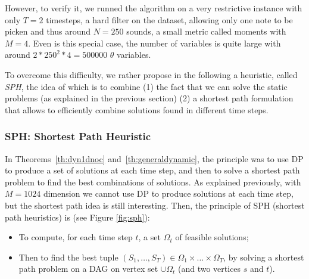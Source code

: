 \documentclass[a4paper]{book}
\begin{document}
However, to verify it, we runned the algorithm on a very restrictive instance with only $T=2$ timesteps, a hard filter on the dataset, allowing only one note to be picken and thus around $N=250$ sounds, a small metric called moments with $M=4$. Even is this special case, the number of variables is quite large with around $2*250^2*4=500000$ $\theta$ variables. 




To overcome this difficulty, we rather propose in the following a heuristic, called {\it SPH}, the idea of which is to combine (1) the fact that we can solve the static problems (as explained in the previous section) (2) a shortest path formulation that allows to efficiently combine  solutions found in different time steps.  


\subsubsection{SPH: Shortest Path Heuristic}





In Theorems~\ref{th:dyn1dnoc} and~\ref{th:generaldynamic}, the principle was to use DP to produce a set of solutions at each time step, and then to solve a shortest path problem to find the best combinations of solutions. As explained previously, with $M=1024$ dimension we cannot use DP to produce solutions at each time step, but the shortest path idea is still interesting. Then, the principle of SPH (shortest path heuristics) is (see Figure \ref{fig:sph}):
\begin{itemize}
    \item To compute, for each time step $t$, a set $\Omega_t$ of feasible solutions;
    \item Then to find the best tuple $(S_1,\dots,S_T)\in \Omega_1\times \dots \times \Omega_T$, by solving a shortest path problem on a DAG on vertex set $\cup \Omega_t$ (and two vertices $s$ and $t$).
\end{itemize}
\end{document}
